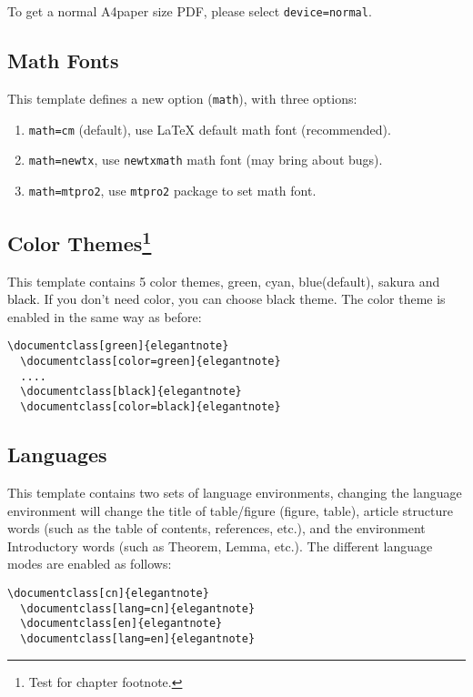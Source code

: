 \documentclass[en,hazy,blue,screen,14pt]{elegantnote}
\begin{document}
\begin{note}
To get a normal A4paper size PDF, please select \lstinline{device=normal}.
\end{note}

\subsection{Math Fonts}

This template defines a new option (\lstinline{math}), with three options:

\begin{enumerate}
  \item \lstinline{math=cm} (default), use \LaTeX{} default math font (recommended).
  \item \lstinline{math=newtx}, use \lstinline{newtxmath} math font (may bring about bugs).
  \item \lstinline{math=mtpro2}, use \lstinline{mtpro2} package to set math font.
\end{enumerate}


\subsection[Color Themes]{Color Themes\footnote{Test for chapter footnote.}}

This template contains 5 color themes, \textcolor{egreen}{green}, \textcolor{ecyan}{cyan}, \textcolor{eblue}{blue}(default), \textcolor{sakura}{sakura} and \textcolor{black}{black}. If you don't need color, you can choose black theme. The color theme is enabled in the same way as before:
\begin{lstlisting}[frame=none]  
  \documentclass[green]{elegantnote}
  \documentclass[color=green]{elegantnote}
  ....
  \documentclass[black]{elegantnote}
  \documentclass[color=black]{elegantnote}
\end{lstlisting}


\subsection{Languages}

This template contains two sets of language environments, changing the language environment will change the title of table/figure (figure, table), article structure words (such as the table of contents, references, etc.), and the environment Introductory words (such as Theorem, Lemma, etc.). The different language modes are enabled as follows:
\begin{lstlisting}[frame=none]  
  \documentclass[cn]{elegantnote}
  \documentclass[lang=cn]{elegantnote}
  \documentclass[en]{elegantnote}
  \documentclass[lang=en]{elegantnote}
\end{lstlisting}
\end{document}
